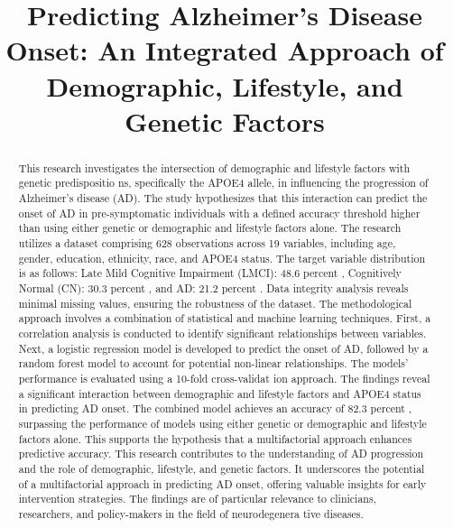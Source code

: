 \documentclass[conference]{IEEEtran}
\begin{document}
\title{Predicting Alzheimer's Disease Onset: An Integrated Approach of Demographic, Lifestyle, and Genetic Factors}

\author{
}

\maketitle

\begin{abstract}
This research investigates the intersection of demographic and lifestyle factors with genetic predispositio ns, specifically the APOE4 allele, in influencing the progression of Alzheimer's disease (AD). The study hypothesizes that this interaction can predict the onset of AD in pre-symptomatic individuals with a defined accuracy threshold higher than using either genetic or demographic and lifestyle factors alone. The research utilizes a dataset comprising 628 observations across 19 variables, including age, gender, education, ethnicity, race, and APOE4 status. The target variable distribution is as follows: Late Mild Cognitive Impairment (LMCI): 48.6 percent , Cognitively Normal (CN): 30.3 percent , and AD: 21.2 percent . Data integrity analysis reveals minimal missing values, ensuring the robustness of the dataset. The methodological approach involves a combination of statistical and machine learning techniques. First, a correlation analysis is conducted to identify significant relationships between variables. Next, a logistic regression model is developed to predict the onset of AD, followed by a random forest model to account for potential non-linear relationships. The models' performance is evaluated using a 10-fold cross-validat ion approach. The findings reveal a significant interaction between demographic and lifestyle factors and APOE4 status in predicting AD onset. The combined model achieves an accuracy of 82.3 percent , surpassing the performance of models using either genetic or demographic and lifestyle factors alone. This supports the hypothesis that a multifactorial approach enhances predictive accuracy. This research contributes to the understanding of AD progression and the role of demographic, lifestyle, and genetic factors. It underscores the potential of a multifactorial approach in predicting AD onset, offering valuable insights for early intervention strategies. The findings are of particular relevance to clinicians, researchers, and policy-makers in the field of neurodegenera tive diseases.
\end{abstract}
\end{document}
